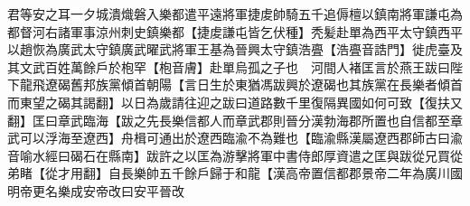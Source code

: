 君等安之耳一夕城潰熾磐入樂都遣平遠將軍捷䖍帥騎五千追傉檀以鎮南將軍謙屯為都督河右諸軍事涼州刺史鎮樂都【捷䖍謙屯皆乞伏種】秃髪赴單為西平太守鎮西平以趙恢為廣武太守鎮廣武曜武將軍王基為晉興太守鎮浩亹【浩亹音誥門】徙虎臺及其文武百姓萬餘戶於枹罕【枹音膚】赴單烏孤之子也　河間人褚匡言於燕王跋曰陛下龍飛遼碣舊邦族黨傾首朝陽【言日生於東猶馮跋興於遼碣也其族黨在長樂者傾首而東望之碣其謁翻】以日為歲請往迎之跋曰道路數千里復隔異國如何可致【復扶又翻】匡曰章武臨海【跋之先長樂信都人而章武郡則晉分漢勃海郡所置也自信都至章武可以浮海至遼西】舟楫可通出於遼西臨渝不為難也【臨渝縣漢屬遼西郡師古曰渝音喻水經曰碣石在縣南】跋許之以匡為游擊將軍中書侍郎厚資遣之匡與跋從兄買從弟睹【從才用翻】自長樂帥五千餘戶歸于和龍【漢高帝置信都郡景帝二年為廣川國明帝更名樂成安帝改曰安平晉改